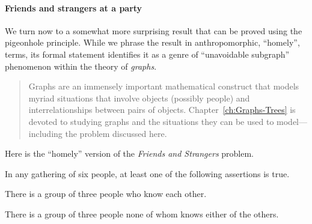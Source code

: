 
\paragraph{\small\sf Friends and strangers at a party}

We turn now to a somewhat more surprising result that can be proved
using the pigeonhole principle.  While we phrase the result in
anthropomorphic, ``homely'', terms, its formal statement identifies it
as a genre of ``unavoidable subgraph''
%
phenomenon within the theory of {\it graphs}.
\begin{quote}
Graphs are an immensely important mathematical construct that models
myriad situations that involve objects (possibly people) and
interrelationships between pairs of objects.
Chapter~\ref{ch:Graphs-Trees} is devoted to studying graphs and the
situations they can be used to model---including the problem discussed
here.
\end{quote}
Here is the ``homely'' version of the {\it Friends and Strangers} problem.

\begin{prop}
\label{thm:triangle-cotriangles}
In any gathering of six people, at least one of the following
assertions is true.

There is a group of three people who know each other.

There is a group of three people none of whom knows either of the
others.
\end{prop}

